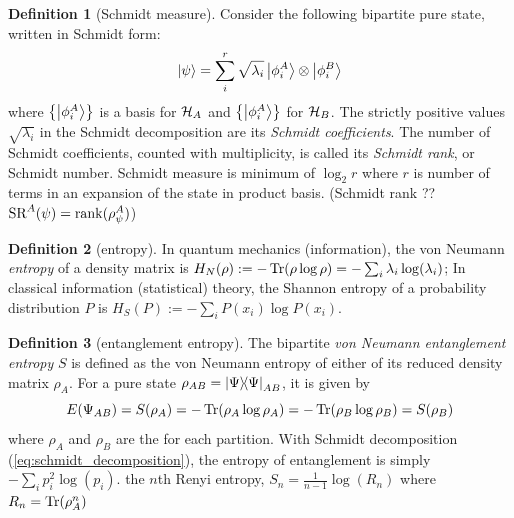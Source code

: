 \documentclass[
aps,
pra,
twocolumn,
floatfix,
]{revtex4-2}
\theoremstyle{plain}
\theoremstyle{definition}
\newtheorem{definition}{Definition}
\newtheorem{remark}{Remark}
\newcommand{\dm}{\rho}
\begin{document}
\begin{definition}[Schmidt measure]\label{def:schmidt_measure}
	Consider the following bipartite pure state, written in Schmidt form:
	\begin{equation}
		\ket{\psi} = \sum_i^r \sqrt{\lambda_i} \ket{\phi_i^A}\otimes\ket{\phi_i^B}
		\label{eq:schmidt_decomposition}
	\end{equation}
	where $\qty{\ket{\phi_i^A}}$ is a basis for $\mathcal{H}_A$ and $\qty{\ket{\phi_i^A}}$ for $\mathcal{H}_B$.
	The strictly positive values $\sqrt{\lambda_i}$ in the Schmidt decomposition are its \emph{Schmidt coefficients}. 
	The number of Schmidt coefficients, counted with multiplicity, is called its \emph{Schmidt rank}, or Schmidt number. 
	Schmidt measure is minimum of $\log_2 r$ where $r$ is number of terms in an expansion of the state in product basis.
	(Schmidt rank ?? $\text{SR}^A(\psi)=\rank(\rho_{\psi}^A)$)
\end{definition}
\begin{definition}[entropy]\label{def:entropy}
	In quantum mechanics (information), the von Neumann \emph{entropy} of a density matrix is $H_N(\dm): = -\Tr(\dm \log \dm)=-\sum_i\lambda_i\log(\lambda_i)$;
	In classical information (statistical) theory, the Shannon entropy of a probability distribution $P$ is  $H_S(P):= -\sum_i P(x_i) \log P(x_i)$.
\end{definition}
\begin{definition}[entanglement entropy]\label{def:entanglement_entropy}
	The bipartite \emph{von Neumann entanglement entropy} $S$
	is defined as the von Neumann entropy of either of
	its reduced density matrix $\dm_A$.
	For a pure state $\dm_{AB}=\op{\Psi}{\Psi}_{AB}$,
	it is given by
	\begin{equation}
		E(\Psi_{AB}) 
		= S(\dm_A)
		= -\Tr(\dm_A \log \dm_A)
		= -\Tr(\dm_B \log \dm_B)
		= S(\dm_B)
	\end{equation}
	where $\dm_A$ and $\dm_B $ 
	are the  for each partition.
	With Schmidt decomposition (\cref{eq:schmidt_decomposition}), the entropy of entanglement is simply $-\sum_ip_i^2\log(p_i)$.
	the $n$th Renyi entropy,
	$S_n = \frac{1}{n-1} \log (R_n)$
	where $R_n = \Tr(\dm^n_A)$
\end{definition}
\end{document}
